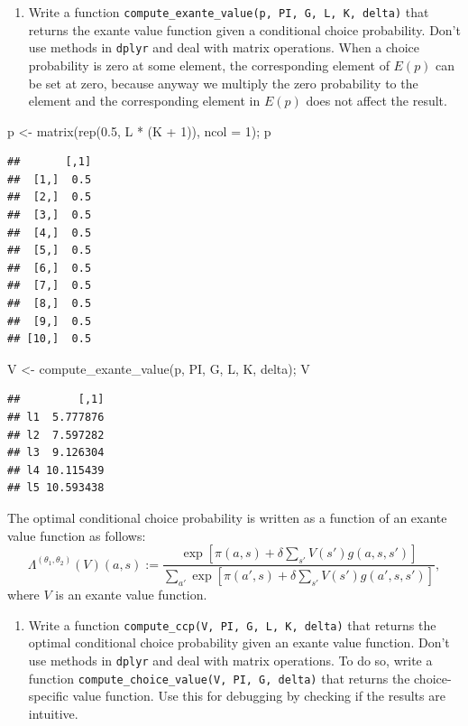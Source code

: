 \documentclass[
]{book}
\newenvironment{Shaded}{\begin{snugshade}}{\end{snugshade}}
\newcommand{\AttributeTok}[1]{\textcolor[rgb]{0.77,0.63,0.00}{#1}}
\newcommand{\DecValTok}[1]{\textcolor[rgb]{0.00,0.00,0.81}{#1}}
\newcommand{\FloatTok}[1]{\textcolor[rgb]{0.00,0.00,0.81}{#1}}
\newcommand{\FunctionTok}[1]{\textcolor[rgb]{0.00,0.00,0.00}{#1}}
\newcommand{\NormalTok}[1]{#1}
\newcommand{\OtherTok}[1]{\textcolor[rgb]{0.56,0.35,0.01}{#1}}
\newcommand{\SpecialCharTok}[1]{\textcolor[rgb]{0.00,0.00,0.00}{#1}}
\providecommand{\tightlist}{%
  \setlength{\itemsep}{0pt}\setlength{\parskip}{0pt}}
\begin{document}
\begin{enumerate}
\def\labelenumi{\arabic{enumi}.}
\setcounter{enumi}{2}
\tightlist
\item
  Write a function \texttt{compute\_exante\_value(p,\ PI,\ G,\ L,\ K,\ delta)} that returns the exante value function given a conditional choice probability. Don't use methods in \texttt{dplyr} and deal with matrix operations. When a choice probability is zero at some element, the corresponding element of \(E(p)\) can be set at zero, because anyway we multiply the zero probability to the element and the corresponding element in \(E(p)\) does not affect the result.
\end{enumerate}

\begin{Shaded}
\begin{Highlighting}[]
\NormalTok{p }\OtherTok{\textless{}{-}} \FunctionTok{matrix}\NormalTok{(}\FunctionTok{rep}\NormalTok{(}\FloatTok{0.5}\NormalTok{, L }\SpecialCharTok{*}\NormalTok{ (K }\SpecialCharTok{+} \DecValTok{1}\NormalTok{)), }\AttributeTok{ncol =} \DecValTok{1}\NormalTok{); p}
\end{Highlighting}
\end{Shaded}

\begin{verbatim}
##       [,1]
##  [1,]  0.5
##  [2,]  0.5
##  [3,]  0.5
##  [4,]  0.5
##  [5,]  0.5
##  [6,]  0.5
##  [7,]  0.5
##  [8,]  0.5
##  [9,]  0.5
## [10,]  0.5
\end{verbatim}

\begin{Shaded}
\begin{Highlighting}[]
\NormalTok{V }\OtherTok{\textless{}{-}} \FunctionTok{compute\_exante\_value}\NormalTok{(p, PI, G, L, K, delta); V}
\end{Highlighting}
\end{Shaded}

\begin{verbatim}
##         [,1]
## l1  5.777876
## l2  7.597282
## l3  9.126304
## l4 10.115439
## l5 10.593438
\end{verbatim}

The optimal conditional choice probability is written as a function of an exante value function as follows:
\[
\Lambda^{(\theta_1, \theta_2)}(V)(a, s) := \frac{\exp[\pi(a, s) + \delta \sum_{s'}V(s')g(a, s, s')]}{\sum_{a'}\exp[\pi(a', s) + \delta \sum_{s'}V(s')g(a', s, s')]},
\]
where \(V\) is an exante value function.

\begin{enumerate}
\def\labelenumi{\arabic{enumi}.}
\setcounter{enumi}{3}
\tightlist
\item
  Write a function \texttt{compute\_ccp(V,\ PI,\ G,\ L,\ K,\ delta)} that returns the optimal conditional choice probability given an exante value function. Don't use methods in \texttt{dplyr} and deal with matrix operations. To do so, write a function \texttt{compute\_choice\_value(V,\ PI,\ G,\ delta)} that returns the choice-specific value function. Use this for debugging by checking if the results are intuitive.
\end{enumerate}
\end{document}
